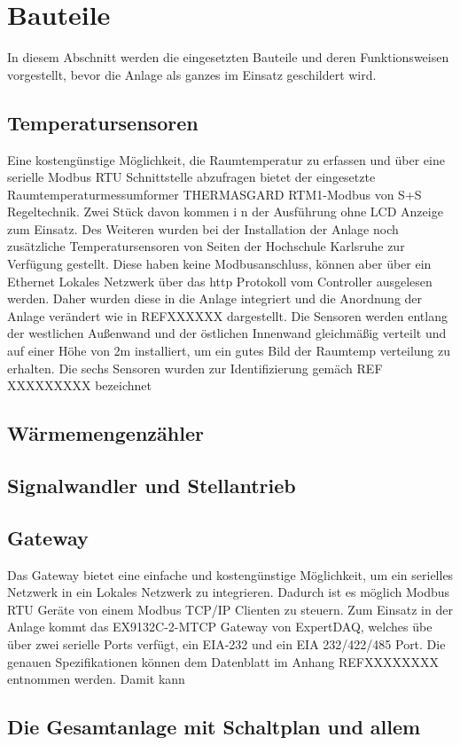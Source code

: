 \section{Bauteile}
In diesem Abschnitt werden die eingesetzten Bauteile und deren Funktionsweisen vorgestellt, bevor die Anlage als ganzes im Einsatz geschildert wird.


\subsection{Temperatursensoren}
Eine kostengünstige Möglichkeit, die Raumtemperatur zu erfassen und über eine serielle Modbus RTU Schnittstelle abzufragen bietet der eingesetzte Raumtemperaturmessumformer THERMASGARD RTM1-Modbus von S+S Regeltechnik. Zwei Stück davon kommen i n der Ausführung ohne LCD Anzeige zum Einsatz. 
Des Weiteren wurden bei der Installation der Anlage noch zusätzliche Temperatursensoren von Seiten der Hochschule Karlsruhe zur Verfügung gestellt. Diese haben keine Modbusanschluss, können aber über ein Ethernet Lokales Netzwerk über das http Protokoll vom Controller ausgelesen werden. Daher wurden diese in die Anlage integriert und die Anordnung der Anlage verändert wie in REFXXXXXX dargestellt. Die Sensoren werden entlang der westlichen Außenwand und der östlichen Innenwand gleichmäßig verteilt und auf einer Höhe von 2m installiert, um ein gutes Bild der Raumtemp verteilung zu erhalten. Die sechs Sensoren wurden zur Identifizierung gemäch REF XXXXXXXXX bezeichnet

\subsection{Wärmemengenzähler}

\subsection{Signalwandler und Stellantrieb}

\subsection{Gateway}
Das Gateway bietet eine einfache und kostengünstige Möglichkeit, um ein serielles Netzwerk in ein Lokales Netzwerk zu integrieren. Dadurch ist es möglich Modbus RTU Geräte von einem Modbus TCP/IP Clienten zu steuern. Zum Einsatz in der Anlage kommt das EX9132C-2-MTCP Gateway von ExpertDAQ, welches übe über zwei serielle Ports verfügt, ein EIA-232 und ein EIA 232/422/485 Port. Die genauen Spezifikationen können dem Datenblatt im Anhang REFXXXXXXXX entnommen werden. Damit kann 

\subsection{Die Gesamtanlage mit Schaltplan und allem}